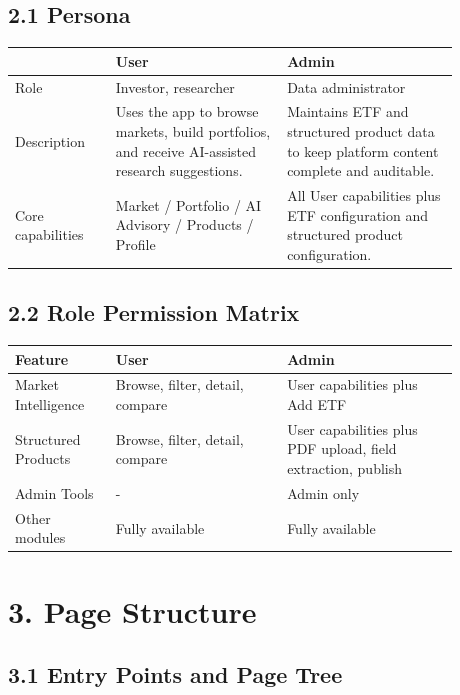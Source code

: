 \subsection{2.1 Persona}

\begingroup
\small
\begin{longtable}{L{0.20\linewidth}L{0.34\linewidth}L{0.34\linewidth}}
\toprule
 & \textbf{User} & \textbf{Admin} \\
\midrule
Role & Investor, researcher & Data administrator \\
Description & Uses the app to browse markets, build portfolios, and receive AI-assisted research suggestions. & Maintains ETF and structured product data to keep platform content complete and auditable. \\
Core capabilities & Market / Portfolio / AI Advisory / Products / Profile & All User capabilities plus ETF configuration and structured product configuration. \\
\bottomrule
\end{longtable}
\endgroup

\subsection{2.2 Role Permission Matrix}

\begingroup
\small
\begin{longtable}{L{0.20\linewidth}L{0.34\linewidth}L{0.34\linewidth}}
\toprule
\textbf{Feature} & \textbf{User} & \textbf{Admin} \\
\midrule
Market Intelligence & Browse, filter, detail, compare & User capabilities plus Add ETF \\
Structured Products & Browse, filter, detail, compare & User capabilities plus PDF upload, field extraction, publish \\
Admin Tools & - & Admin only \\
Other modules & Fully available & Fully available \\
\bottomrule
\end{longtable}
\endgroup

\section{3. Page Structure}

\subsection{3.1 Entry Points and Page Tree}






